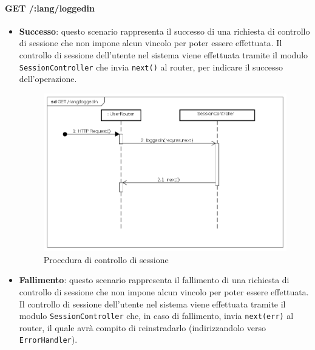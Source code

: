 \paragraph{GET /:lang/loggedin}
\begin{itemize}
\item \textbf{Successo}: questo scenario rappresenta il successo di una richiesta di controllo di sessione che non impone alcun vincolo per poter essere effettuata. Il controllo di sessione dell'utente nel sistema viene effettuata tramite il modulo \texttt{SessionController} che invia \texttt{next()} al router, per indicare il successo dell'operazione.

\label{Procedura di controllo di sessione}
\begin{figure}[ht]
	\centering
	\includegraphics[scale=0.40]{UML/DiagrammiDiSequenza/Back-end/GET__lang_loggedin_success.png}
	\caption{Procedura di controllo di sessione}
\end{figure}
\FloatBarrier
 
\item \textbf{Fallimento}: questo scenario rappresenta il fallimento di una richiesta di controllo di sessione che non impone alcun vincolo per poter essere effettuata. Il controllo di sessione dell'utente nel sistema viene effettuata tramite il modulo \texttt{SessionController} che, in caso di fallimento, invia \texttt{next(err)} al router, il quale avrà compito di reinstradarlo (indirizzandolo verso \texttt{ErrorHandler}).


\end{itemize}
